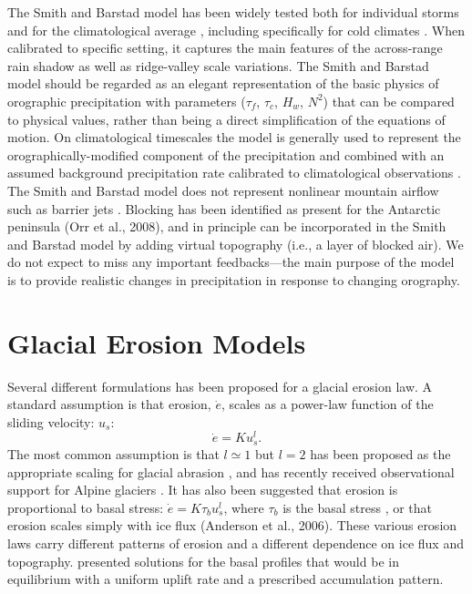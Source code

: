 \documentclass[11pt]{article}
\begin{document}
The Smith and Barstad model has been widely tested both for individual storms \citep{Barstad2005,Roe2007} and for the climatological average \citep{Smith2004,Smith2005,Smith2007a}, including specifically for cold climates \citep{Anders2008,Schuler2008,Jarosch2012,Barstad2013}. When calibrated to specific setting, it captures the main features of the across-range rain shadow as well as ridge-valley scale variations. The Smith and Barstad model should be regarded as an elegant representation of the basic physics of orographic precipitation with parameters ($\tau_{f}$, $\tau_{c}$, $H_{w}$, $N^{2}$) that can be compared to physical values, rather than being a direct simplification of the equations of motion. On climatological timescales the model is generally used to represent the orographically-modified
 component of the precipitation and combined with an assumed background precipitation rate calibrated to climatological observations \citep[e.g., ][]{Anders2008,Jarosch2012}. The Smith and Barstad model does not represent nonlinear mountain airflow such as barrier jets \citep[e.g., ][]{Galewsky2009a}. Blocking has been identified as present for the Antarctic peninsula (Orr et al., 2008), and in principle can be incorporated in the Smith and Barstad model by adding virtual topography (i.e., a layer of blocked air). We do not expect to miss any important feedbacks---the main purpose of the model is to provide realistic changes in precipitation in response to changing orography. 


\section{Glacial Erosion Models}

Several different formulations has been proposed for a glacial erosion law. A standard assumption is that erosion, $\dot{e}$, scales as a power-law function of the sliding velocity: $u_s$: 
\begin{equation}
\dot{e} = K u_s^l.
\end{equation} 
The most common assumption is that $l \simeq 1$ \citep[e.g., ][]{Harbor1992,Humphrey1994} but $l = 2$ has been proposed as the appropriate scaling for glacial abrasion \citep{Hallet1979}, and has recently received observational support for Alpine glaciers \citep{Herman2015}. It has also been suggested that erosion is proportional to basal stress: $\dot{e} = K \tau_b u_s^l$, where $\tau_b$ is the basal stress \citep{Pollard2003}, or that erosion scales simply with ice flux (Anderson et al., 2006). These various erosion laws carry different patterns of erosion \citep{Tomkin2007,Headley2012a} and a different dependence on ice flux and topography. \cite{Headley2012} presented solutions for the basal profiles that would be in equilibrium with a uniform uplift rate and a prescribed accumulation pattern.
\end{document}
